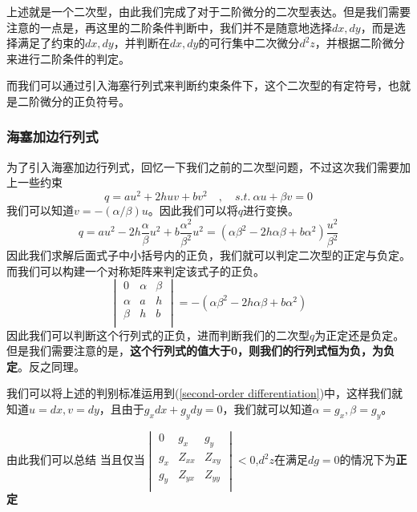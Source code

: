 \documentclass[UTF8,12pt]{ctexart}
\numberwithin{equation}{section} %
\numberwithin{figure}{section}
\numberwithin{table}{section}
\begin{document}
	上述就是一个二次型，由此我们完成了对于二阶微分的二次型表达。但是我们需要注意的一点是，再这里的二阶条件判断中，我们并不是随意地选择$dx,dy$，而是选择满足了约束的$dx,dy$，并判断在$dx,dy$的可行集中二次微分$d^2z$，并根据二阶微分来进行二阶条件的判定。
	
	而我们可以通过引入海塞行列式来判断约束条件下，这个二次型的有定符号，也就是二阶微分的正负符号。
	
	
	
	\subsubsection{海塞加边行列式}
	为了引入海塞加边行列式，回忆一下我们之前的二次型问题，不过这次我们需要加上一些约束
	\begin{equation}
		q = au^2 + 2huv + bv^2 \quad , \quad s.t. \ \alpha u + \beta v = 0
	\end{equation}
	我们可以知道$v = -(\alpha / \beta)u$。因此我们可以将$q$进行变换。
	\begin{equation}
		q = au^2 - 2h\frac{\alpha}{\beta}u^2 + b\frac{\alpha^2}{\beta^2}u^2
		=(\alpha \beta^2 - 2h\alpha \beta + b\alpha^2)\frac{u^2}{\beta^2}
	\end{equation}
	因此我们求解后面式子中小括号内的正负，我们就可以判定二次型的正定与负定。而我们可以构建一个对称矩阵来判定该式子的正负。
	\begin{equation}
		\begin{vmatrix}
			0 & \alpha & \beta \\
			\alpha & a & h \\
			\beta & h & b \\
		\end{vmatrix}
		=
		-(\alpha \beta^2 - 2h\alpha \beta + b\alpha^2)
	\end{equation}
	因此我们可以判断这个行列式的正负，进而判断我们的二次型$q$为正定还是负定。但是我们需要注意的是，\textbf{这个行列式的值大于0，则我们的行列式恒为负，为负定}。反之同理。
	
	我们可以将上述的判别标准运用到(\ref{second-order differentiation})中，这样我们就知道$u = dx,v = dy$，且由于$g_xdx+g_ydy = 0$，我们就可以知道$\alpha = g_x,\beta = g_y$。
	
	由此我们可以总结
	当且仅当$
	\begin{vmatrix}
		0 & g_x & g_y \\
		g_x & Z_{xx} & Z_{xy}\\
		g_y & Z_{yx} & Z_{yy}\\
	\end{vmatrix} < 0
	$,$d^2z$在满足$dg = 0$的情况下为\textbf{正定}
	
\end{document}
